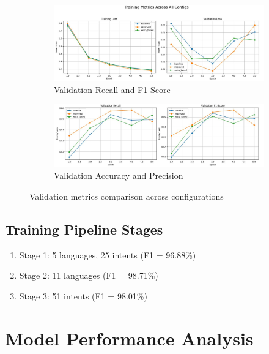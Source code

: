 \documentclass{ecai}
\begin{document}
    \begin{figure}[H]
        \centering
        \begin{subfigure}{0.48\textwidth}
            \includegraphics[width=\linewidth]{training_matrices_1.jpeg}
            \caption{Validation Recall and F1-Score}
        \end{subfigure}
        \hfill
        \begin{subfigure}{0.48\textwidth}
            \includegraphics[width=\linewidth]{training_matrices_2.jpeg}
            \caption{Validation Accuracy and Precision}
        \end{subfigure}
        \caption{Validation metrics comparison across configurations}
        \label{fig:val_metrics}
    \end{figure}


\subsection{Training Pipeline Stages}
\begin{enumerate}
    \item Stage 1: 5 languages, 25 intents (F1 = 96.88\%)
    \item Stage 2: 11 languages (F1 = 98.71\%)
    \item Stage 3: 51 intents (F1 = 98.01\%)
\end{enumerate}

\section{Model Performance Analysis}
\end{document}
